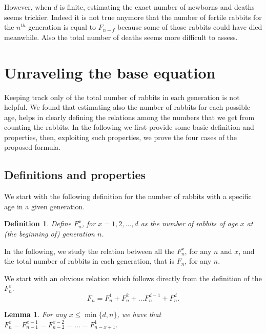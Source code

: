 \documentclass[11pt,epsf]{article}
\newtheorem{lemma}[theorem]{Lemma}
\newtheorem{definition}[theorem]{Definition}
\begin{document}

However, when $d$ is finite, estimating the exact number of newborns and deaths seems trickier. 
Indeed it is not true anymore that the number of fertile rabbits for the $n^{th}$ generation is equal
to $F_{n-f}$ because some of those rabbits could have died meanwhile. Also the total number of deaths
seems more difficult to assess.

\section{Unraveling the base equation}

Keeping track only of the total number of rabbits in each generation is not helpful.
We found that estimating also the number of rabbits for each possible age,
helps in clearly defining the relations among the numbers that we get from counting the rabbits. 
In the following we first provide some basic definition and properties, then, exploiting such properties,
we prove the four cases of the proposed formula.

\subsection{Definitions and properties}

We start with the following definition for the number of rabbits with a specific age in a given generation.

\begin{definition}\label{def:F_n^x}
Define $F_n^x$, for $x=1,2,\ldots,d$ as the number of rabbits of age $x$ at (the beginning of) generation $n$.
\end{definition}

\smallskip

\noindent
In the following, we  study the relation between all the $F_n^x$, for any $n$ and $x$, and the total number of rabbits in each generation,
that is $F_n$, for any $n$. 

\medskip

\noindent
We start with an obvious relation which follows directly from the definition of the $F_n^x$.
\begin{equation}\label{eq:Fn=sum_of_row}
F_n = F_n^1 + F_n^2 + \ldots F_n^{d-1} + F_n^d.
\end{equation}

\begin{lemma}\label{lem:goback}
For any $x\le\min\{d,n\}$, we have that
$F_n^{x}=F_{n-1}^{x-1}=F_{n-2}^{x-2}=\ldots=F_{n-x+1}^1.$
\end{lemma}
\end{document}
